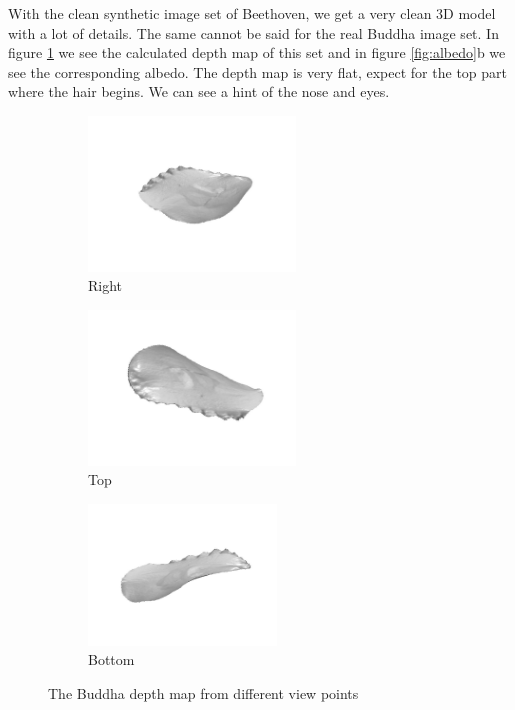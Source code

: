 \documentclass[12pt,a4paper,oneside,final]{article}
\begin{document}
With the clean synthetic image set of Beethoven, we get a very clean 3D model with a lot of details. The same cannot be said for the real Buddha image set. In figure \ref{fig:BuddahDepth} we see the calculated depth map of this set and in figure \ref{fig:albedo}b we see the corresponding albedo. The depth map is very flat, expect for the top part where the hair begins. We can see a hint of the nose and eyes.
\begin{figure}[H]
	\centering
	\begin{subfigure}{.33\textwidth}
		\centering
		\includegraphics[width=5.5cm]{Buddha1}
		\caption{Right}
	\end{subfigure}%
	\begin{subfigure}{.33\textwidth}
		\centering
		\includegraphics[width=5.5cm]{Buddha2}
		\caption{Top}
	\end{subfigure}%
	\begin{subfigure}{.33\textwidth}
		\centering
		\includegraphics[width=5cm]{Buddha3}
		\caption{Bottom}
	\end{subfigure}
	\caption{The Buddha depth map from different view points}
	\label{fig:BuddahDepth}
\end{figure}
\end{document}
